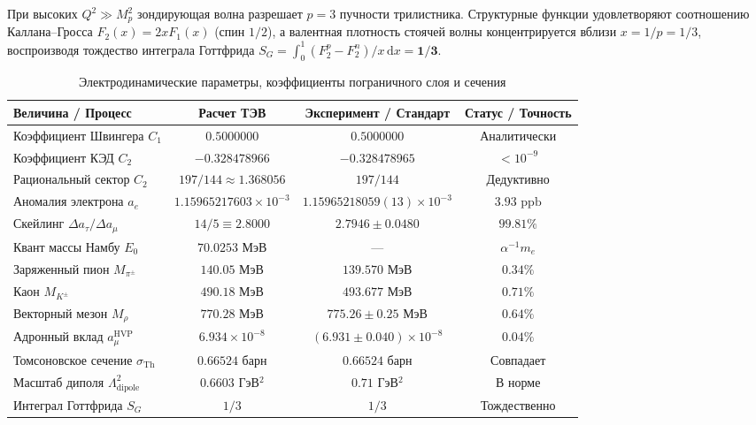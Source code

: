 \documentclass[11pt,a4paper]{article}
\theoremstyle{definition}
\theoremstyle{remark}
\begin{document}
При высоких $Q^2 \gg M_p^2$ зондирующая волна разрешает $p=3$ пучности трилистника. Структурные функции удовлетворяют соотношению Каллана--Гросса $F_2(x) = 2x F_1(x)$ (спин $1/2$), а валентная плотность стоячей волны концентрируется вблизи $x = 1/p = 1/3$, воспроизводя тождество интеграла Готтфрида $S_G = \int_0^1 (F_2^p - F_2^n)/x \, \mathrm{d}x = \mathbf{1/3}$.

\begin{table}[H]
\centering
\small
\caption{Электродинамические параметры, коэффициенты пограничного слоя и сечения}
\label{tab:scattering_qed}
\vspace{2mm}
\begin{tabular}{lccc}
\toprule
\textbf{Величина / Процесс} & \textbf{Расчет ТЭВ} & \textbf{Эксперимент / Стандарт} & \textbf{Статус / Точность} \\
\midrule
Коэффициент Швингера $C_1$ & $0.5000000$ & $0.5000000$ & Аналитически \\
Коэффициент КЭД $C_2$ & $-0.328478966$ & $-0.328478965$ & $< 10^{-9}$ \\
Рациональный сектор $C_2$ & $197/144 \approx 1.368056$ & $197/144$ & Дедуктивно \\
Аномалия электрона $a_e$ & $1.15965217603 \times 10^{-3}$ & $1.15965218059(13)\times 10^{-3}$ & $3.93\text{ ppb}$ \\
Скейлинг $\Delta a_\tau / \Delta a_\mu$ & $14/5 \equiv 2.8000$ & $2.7946 \pm 0.0480$ & $99.81\%$ \\
\midrule
Квант массы Намбу $E_0$ & $70.0253$ МэВ & --- & $\alpha^{-1} m_e$ \\
Заряженный пион $M_{\pi^\pm}$ & $140.05$ МэВ & $139.570$ МэВ & $0.34\%$ \\
Каон $M_{K^\pm}$ & $490.18$ МэВ & $493.677$ МэВ & $0.71\%$ \\
Векторный мезон $M_\rho$ & $770.28$ МэВ & $775.26 \pm 0.25$ МэВ & $0.64\%$ \\
Адронный вклад $a_\mu^{\mathrm{HVP}}$ & $6.934 \times 10^{-8}$ & $(6.931 \pm 0.040)\times 10^{-8}$ & $0.04\%$ \\
\midrule
Томсоновское сечение $\sigma_{\mathrm{Th}}$ & $0.66524$ барн & $0.66524$ барн & Совпадает \\
Масштаб диполя $\Lambda_{\mathrm{dipole}}^2$ & $0.6603$ ГэВ$^2$ & $0.71$ ГэВ$^2$ & В норме \\
Интеграл Готтфрида $S_G$ & $1/3$ & $1/3$ & Тождественно \\
\bottomrule
\end{tabular}
\end{table}
\end{document}
